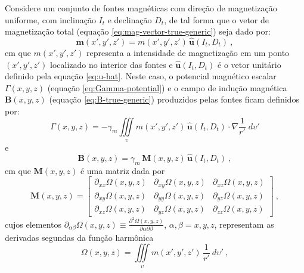 Considere um conjunto de fontes magnéticas com direção de magnetização 
uniforme, com inclinação $I_{t}$ e declinação $D_{t}$, de tal forma que o vetor 
de magnetização total (equação \ref{eq:mag-vector-true-generic}) seja dado por:
\begin{equation}
\mathbf{m}(x', y', z') = m(x', y', z') \, \hat{\mathbf{u}}(I_{t}, D_{t}) \: ,
\label{eq:mag-vector-true-uniform}
\end{equation}
em que $m(x', y', z')$ representa a intensidade de magnetização em um ponto $(x', y', z')$ 
localizado no interior das fontes e $\hat{\mathbf{u}}(I_{t}, D_{t})$ é o vetor unitário 
definido pela equação \ref{eq:u-hat}.
Neste caso, o potencial magnético escalar $\Gamma(x, y, z)$ (equação \ref{eq:Gamma-potential}) 
e o campo de indução magnética $\mathbf{B}(x, y, z)$ (equação \ref{eq:B-true-generic}) produzidos 
pelas fontes ficam definidos por:
\begin{equation}
\Gamma(x, y, z) = - \gamma_{m} \iiint\limits_{\upsilon} 
m(x', y', z') \, \hat{\mathbf{u}}(I_{t}, D_{t}) \cdot \nabla\frac{1}{r'} 
\; d\upsilon'
\label{eq:Gamma-potential-mag-uniform}
\end{equation}
e
\begin{equation}
\mathbf{B}(x, y, z) = \gamma_{m} \, \mathbf{M}(x, y, z) \, \hat{\mathbf{u}}(I_{t}, D_{t}) \: ,
\label{eq:B-true-mag-uniform}
\end{equation}
em que $\mathbf{M}(x, y, z)$ é uma matriz dada por
\begin{equation}
	\mathbf{M}(x, y, z) = \begin{bmatrix}
		\partial_{xx} \Omega(x, y, z) & 
		\partial_{xy} \Omega(x, y, z) &
		\partial_{xz} \Omega(x, y, z) \\
		\partial_{xy} \Omega(x, y, z) & 
		\partial_{yy} \Omega(x, y, z) &
		\partial_{yz} \Omega(x, y, z) \\
		\partial_{xz} \Omega(x, y, z) & 
		\partial_{yz} \Omega(x, y, z) &
		\partial_{zz} \Omega(x, y, z)
	\end{bmatrix} \: ,
	\label{eq:M-matrix}
\end{equation}
cujos elementos $\partial_{\alpha\beta} \Omega(x, y, z) \equiv 
\frac{\partial^{2} \Omega(x, y, z)}{\partial \alpha \partial \beta}$, 
$\alpha, \beta = x, y, z$, representam as derivadas segundas da função harmônica 
\begin{equation}
\Omega(x, y, z) = \iiint\limits_{\upsilon} 
m(x', y', z') \, \frac{1}{r'} \: d\upsilon' \: ,
\label{eq:Omega-potential}
\end{equation}
